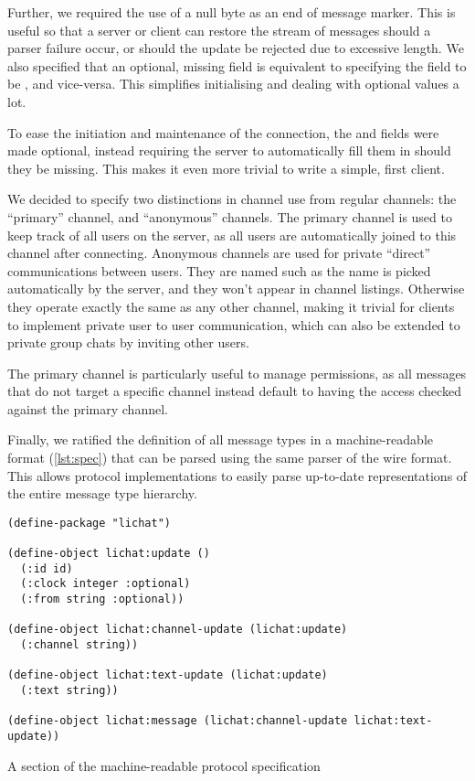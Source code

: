 \documentclass[format=sigconf]{acmart}
\begin{document}
Further, we required the use of a null byte as an end of message marker. This is useful so that a server or client can restore the stream of messages should a parser failure occur, or should the update be rejected due to excessive length. We also specified that an optional, missing field is equivalent to specifying the field to be , and vice-versa. This simplifies initialising and dealing with optional values a lot.

To ease the initiation and maintenance of the connection, the  and  fields were made optional, instead requiring the server to automatically fill them in should they be missing. This makes it even more trivial to write a simple, first client.

We decided to specify two distinctions in channel use from regular channels: the ``primary'' channel, and ``anonymous'' channels. The primary channel is used to keep track of all users on the server, as all users are automatically joined to this channel after connecting. Anonymous channels are used for private ``direct'' communications between users. They are named such as the name is picked automatically by the server, and they won't appear in channel listings. Otherwise they operate exactly the same as any other channel, making it trivial for clients to implement private user to user communication, which can also be extended to private group chats by inviting other users.

The primary channel is particularly useful to manage permissions, as all messages that do not target a specific channel instead default to having the access checked against the primary channel.

Finally, we ratified the definition of all message types in a machine-readable format (\autoref{lst:spec}) that can be parsed using the same parser of the wire format. This allows protocol implementations to easily parse up-to-date representations of the entire message type hierarchy.

\begin{listing}
\begin{verbatim}
(define-package "lichat")

(define-object lichat:update ()
  (:id id)
  (:clock integer :optional)
  (:from string :optional))

(define-object lichat:channel-update (lichat:update)
  (:channel string))

(define-object lichat:text-update (lichat:update)
  (:text string))

(define-object lichat:message (lichat:channel-update lichat:text-update))
\end{verbatim}
\caption{A section of the machine-readable protocol specification}
\label{lst:spec}
\end{listing}
\end{document}
